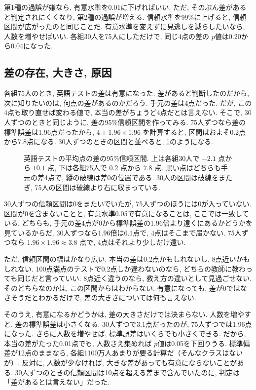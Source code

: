     第1種の過誤が嫌なら, 有意水準を0.01に下げればいい.
    ただ, そのぶん差があると判定されにくくなり, 第2種の過誤が増える.
    信頼水準を99\%に上げると, 信頼区間が広がったのと同じことだ.
    有意水準を変えずに見逃しを減らしたいなら, 人数を増やせばいい.
    各組30人を75人にしただけで, 同じ4点の差の $p$値は0.20から0.04になった.

  \subsection{差の存在, 大きさ, 原因}

    各組75人のとき, 英語テストの差は有意になった.
    差があると判断したのだから, 次に知りたいのは, 何点の差があるのかだろう.
    手元の差は4点だった.
    だが, この4点も取り直せば変わる値で, 本当の差がちょうど4点だとは言えない.
    そこで, 30人ずつのときと同じように, 差の95\%信頼区間を作ってみる.
    75人ずつなら差の標準誤差は1.96点だったから, $4 \pm 1.96 \times 1.96$ を計算すると, 区間はおよそ0.2点から7.8点になる.
    30人ずつのときの区間と並べると, \cref{fig:ch05-ci-compare}のようになる.

    \begin{figure}[htbp]
      \centering
      
      \caption{英語テストの平均点の差の95\%信頼区間. 上は各組30人で $-2.1$ 点から $10.1$ 点, 下は各組75人で $0.2$ 点から $7.8$ 点. 黒い点はどちらも手元の差4点で, 縦の破線は差0の位置である. 30人の区間は破線をまたぎ, 75人の区間は破線より右に収まっている.}
      \label{fig:ch05-ci-compare}
    \end{figure}

    30人ずつの信頼区間は0をまたいでいたが, 75人ずつのほうには0が入っていない.
    区間が0を含まないことと, 有意水準0.05で有意になることは, ここでは一致している.
    どちらも, 手元の差4点が0から標準誤差の1.96倍より遠くにあるかどうかを見ているからだ.
    30人ずつなら1.96倍は6.1点で, 4点はそこまで届かない.
    75人ずつなら $1.96 \times 1.96 \approx 3.8$ 点で, 4点はそれより少しだけ遠い.

    ただ, 信頼区間の幅はかなり広い.
    本当の差は0.2点かもしれないし, 8点近いかもしれない.
    100点満点のテストで0.2点しか違わないのなら, どちらの教師に教わっても同じだと言っていい.
    8点近く違うのなら, 教え方の違いとして見過ごせない.
    そのどちらなのかは, この区間からはわからない.
    有意になっても, 差が0ではなさそうだとわかるだけで, 差の大きさについては何も言えない.

    そのうえ, 有意になるかどうかは, 差の大きさだけでは決まらない.
    人数を増やすと, 差の標準誤差は小さくなる.
    30人ずつで3.1点だったのが, 75人ずつでは1.96点になった.
    さらに人数を増やせば, 標準誤差はいくらでも小さくできる.
    だから, 本当の差がたった0.01点でも, 人数さえ集めれば $p$値は0.05を下回りうる.
    標準偏差が12点のままなら, 各組1100万人あまりが要る計算だ（そんなクラスはないが）.
    反対に, 人数が少なければ, 大きな差があっても有意にならないことがある.
    30人ずつのときの信頼区間は10点を超える差まで含んでいたのに, 判定は「差があるとは言えない」だった.

